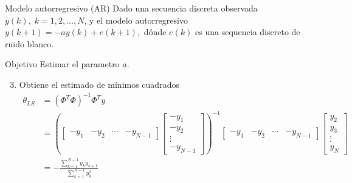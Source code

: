 \documentclass[presentation,aspectratio=169]{beamer}
\begin{document}
\begin{frame}[label={sec:org4fc2360}]{Modelo autorregresivo (AR)}
Dado una secuencia discreta observada \(y(k), \; k=1,2,\ldots,N\), y el modelo autorregresivo
\(y(k+1) = -ay(k) + e(k+1),\)
dónde \(e(k)\) es una sequencia discreto de ruido blanco.

\alert{Objetivo} Estimar el parametro \(a\).

\begin{enumerate}
\setcounter{enumi}{2}
\item Obtiene el estimado de mínimos cuadrados 
\begin{align*}
 \theta_{LS} &= (\Phi^T\Phi)^{-1}\Phi^T y\\ &= \left(\begin{bmatrix} -y_1 & -y_2 & \cdots & -y_{N-1}\end{bmatrix}\begin{bmatrix}-y_1\\-y_2\\\vdots\\-y_{N-1}\end{bmatrix}\right)^{-1}\begin{bmatrix} -y_1 & -y_2 & \cdots & -y_{N-1}\end{bmatrix}\begin{bmatrix}y_2\\y_3\\\vdots\\y_N\end{bmatrix}\\
 &= -\frac{\sum_{k=1}^{N-1} y_ky_{k+1}}{\sum_{k=1}^{N-1}y_k^2}
 \end{align*}
\end{enumerate}
\end{frame}
\end{document}
